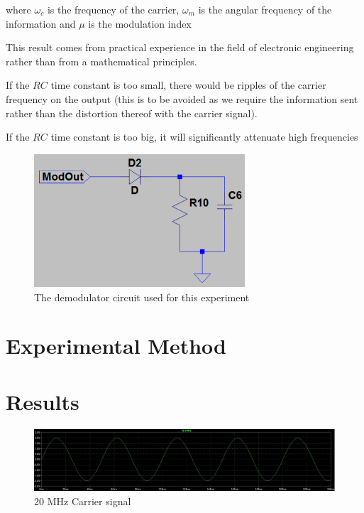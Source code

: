 \documentclass[12pt, a4paper]{article}
\begin{document}
		where $\omega_c$ is the frequency of the carrier, $\omega_m$ is the angular frequency of the information and $\mu$ is the modulation index

		This result comes from practical experience in the field of electronic engineering rather than from a mathematical principles.

		If the $RC$ time constant is too small, there would be ripples of the carrier frequency on the output (this is to be avoided as we require the information sent rather than the distortion thereof with the carrier signal).

		If the $RC$ time constant is too big, it will significantly attenuate high frequencies 


		\begin{figure}[H]
			\centering
			\includegraphics[width=0.7\textwidth]{images/Demodulator_circuit.png}
			\caption{The demodulator circuit used for this experiment}
			\label{fig:demodulator_circuit}
		\end{figure}

	\subsection{}

\section{Experimental Method} %
\label{sec:experimental_method}

	

\section{Results} %
\label{sec:results}
	\begin{figure}[H]
		\centering
		\includegraphics[width=.8\textwidth]{images/carrier.JPG}
		\caption{20 MHz Carrier signal}
		\label{fig:carrier}
	\end{figure}
\end{document}

